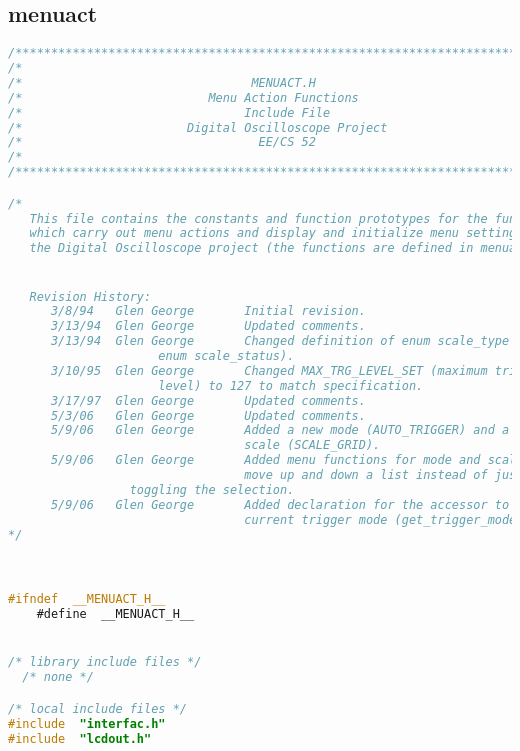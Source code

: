 \subsection{menuact}
\begin{lstlisting}[language=C]
/****************************************************************************/
/*                                                                          */
/*                                MENUACT.H                                 */
/*                          Menu Action Functions                           */
/*                               Include File                               */
/*                       Digital Oscilloscope Project                       */
/*                                 EE/CS 52                                 */
/*                                                                          */
/****************************************************************************/

/*
   This file contains the constants and function prototypes for the functions
   which carry out menu actions and display and initialize menu settings for
   the Digital Oscilloscope project (the functions are defined in menuact.c).


   Revision History:
      3/8/94   Glen George       Initial revision.
      3/13/94  Glen George       Updated comments.
      3/13/94  Glen George       Changed definition of enum scale_type (was
      				 enum scale_status).
      3/10/95  Glen George       Changed MAX_TRG_LEVEL_SET (maximum trigger
      				 level) to 127 to match specification.
      3/17/97  Glen George       Updated comments.
      5/3/06   Glen George       Updated comments.
      5/9/06   Glen George       Added a new mode (AUTO_TRIGGER) and a new
                                 scale (SCALE_GRID).
      5/9/06   Glen George       Added menu functions for mode and scale to
                                 move up and down a list instead of just
				 toggling the selection.
      5/9/06   Glen George       Added declaration for the accessor to the
                                 current trigger mode (get_trigger_mode).
*/



#ifndef  __MENUACT_H__
    #define  __MENUACT_H__


/* library include files */
  /* none */

/* local include files */
#include  "interfac.h"
#include  "lcdout.h"





\end{lstlisting}
